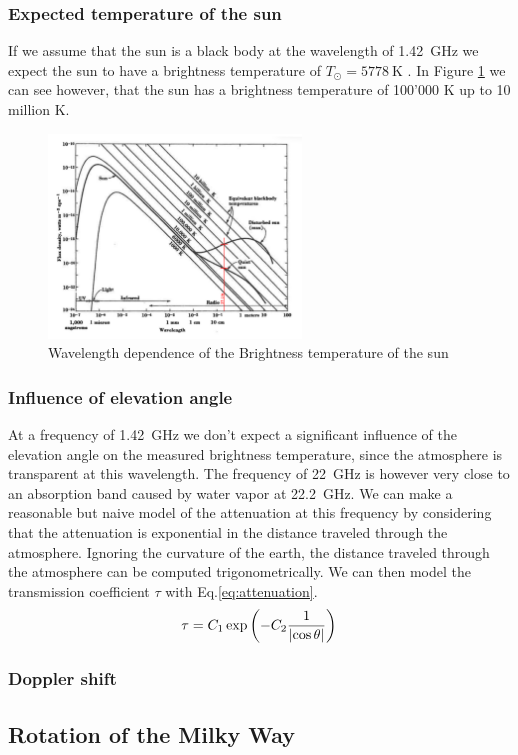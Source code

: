 \subsubsection{Expected temperature of the sun}\label{sec:sun_temp}
If we assume that the sun is a black body at the wavelength of \SI{1.42}{\giga\hertz} we expect the sun to have a brightness temperature of $T_{\odot} = \SI{5778}{\kelvin}$ \cite[p. 211]{durandi_formeln_2011}.
In Figure \ref{fig:sun_temp_theory} we can see however, that the sun has a brightness temperature of 100'000 \si{\kelvin} up to 10 million \si{\kelvin}.
\begin{figure}[H]
    \centering
    \includegraphics[width=0.6\textwidth]{assets/SunBrightnessTheory.png}
    \caption{Wavelength dependence of the Brightness temperature of the sun \cite[p.8-45 Fig. 8-34]{kraus_radio_1986}}
    \label{fig:sun_temp_theory}
\end{figure}

\subsubsection{Influence of elevation angle}
At a frequency of \SI{1.42}{\giga\hertz} we don't expect a significant influence of the elevation angle on the measured brightness temperature, since the atmosphere is transparent at this wavelength.
The frequency of \SI{22}{\giga\hertz} is however very close to an absorption band caused by water vapor  at \SI{22.2}{\giga\hertz}.
We can make a reasonable but naive model of the attenuation at this frequency by considering that the attenuation is exponential in the distance traveled through the atmosphere.
Ignoring the curvature of the earth, the distance traveled through the atmosphere can be computed trigonometrically. We can then model the transmission coefficient $\tau$ with Eq.\eqref{eq:attenuation}.
\begin{equation}
    \tau = C_1 \exp{\left( - C_2 \frac{1}{\left\lvert \cos{\theta}\right\rvert} \right)} \label{eq:attenuation}
\end{equation}

\subsubsection{Doppler shift}

\subsection{Rotation of the Milky Way}
